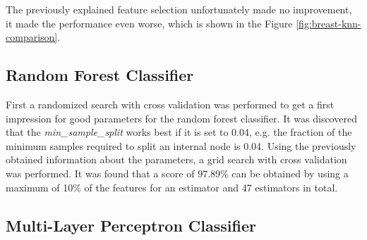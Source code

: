 
The previously explained feature selection unfortunately made no improvement, it made the performance even worse, which is shown in the Figure \ref{fig:breast-knn-comparison}.


\subsection{Random Forest Classifier}

First a randomized search with cross validation was performed to get a first impression for good parameters for the random forest classifier.
It was discovered that the \textit{min\_sample\_split} works best if it is set to 0.04, e.g. the fraction of the minimum samples required to split an internal node is 0.04.
Using the previously obtained information about the parameters, a grid search with cross validation was performed.
It was found that a score of 97.89\% can be obtained by using a maximum of 10\% of the features for an estimator and 47 estimators in total.


\subsection{Multi-Layer Perceptron Classifier}

